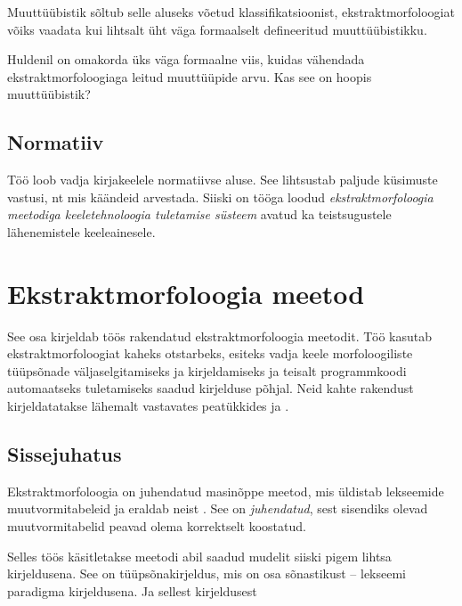 \documentclass[12pt,a4paper]{article}
\begin{document}
Muuttüübistik sõltub selle aluseks võetud klassifikatsioonist, ekstrakt\-morfoloogiat võiks vaadata kui lihtsalt üht väga formaalselt defineeritud muuttüübistikku.

Huldenil on omakorda üks väga formaalne viis, kuidas vähendada ekstrakt\-morfoloogiaga leitud muuttüüpide arvu. Kas see on hoopis muuttüübistik?

\subsection{Normatiiv}
\label{sec:normatiiv}

Töö loob vadja kirjakeelele normatiivse aluse. See lihtsustab paljude küsimuste vastusi, nt mis käändeid arvestada. Siiski on tööga loodud \textit{ekstrakt\-morfoloogia meetodiga keele\-tehnoloogia tuletamise süsteem} avatud ka teistsugustele lähenemistele keeleainesele.




\newpage
\section{Ekstraktmorfoloogia meetod}
\label{sec:ekstraktmorfoloogia-meetod}
See osa kirjeldab töös rakendatud ekstraktmorfoloogia meetodit. Töö kasutab ekstraktmorfoloogiat kaheks otstarbeks, esiteks vadja keele morfoloogiliste tüüpsõnade väljaselgitamiseks ja kirjeldamiseks ja teisalt programmkoodi automaatseks tuletamiseks saadud kirjelduse põhjal. Neid kahte rakendust kirjeldatatakse lähemalt vastavates peatükkides \textit{} ja \textit{}.




\subsection{Sissejuhatus}
\label{sec:ekstraktmorfoloogia-sissejuhatus}

Ekstraktmorfoloogia on juhendatud masinõppe meetod, mis üldistab lekseemide muutvormitabeleid ja eraldab neist . See on \textit{juhendatud}, sest sisendiks olevad muutvormitabelid peavad olema korrektselt koostatud. %

Selles töös käsitletakse meetodi abil saadud mudelit siiski pigem lihtsa kirjeldusena. See on tüüpsõnakirjeldus, mis on osa sõnastikust -- lekseemi paradigma kirjeldusena. Ja sellest kirjeldusest 
\end{document}
